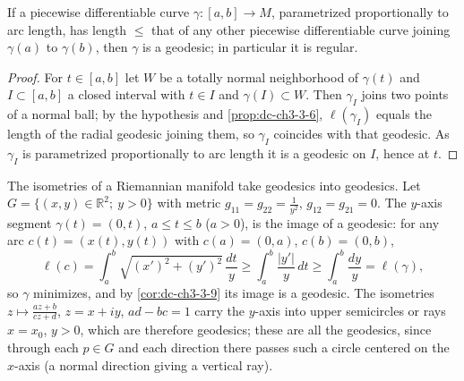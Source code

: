 \begin{corollary}
  \label{cor:dc-ch3-3-9}
  \leanok
  If a piecewise differentiable curve $\gamma:[a,b]\to M$, parametrized
  proportionally to arc length, has length $\le$ that of any other piecewise
  differentiable curve joining $\gamma(a)$ to $\gamma(b)$, then $\gamma$ is a
  geodesic; in particular it is regular.
\end{corollary}
\begin{proof}
  \sketch
  \leanok
  For $t\in[a,b]$ let $W$ be a totally normal neighborhood of $\gamma(t)$
  and $I\subset[a,b]$ a closed interval with $t\in I$ and $\gamma(I)\subset W$.
  Then $\gamma_I$ joins two points of a normal ball; by the hypothesis and
  \cref{prop:dc-ch3-3-6}, $\ell(\gamma_I)$ equals the length of the radial geodesic joining
  them, so $\gamma_I$ coincides with that geodesic. As $\gamma_I$ is parametrized
  proportionally to arc length it is a geodesic on $I$, hence at $t$.
\end{proof}

\begin{example}
  \label{ex:dc-ch3-3-10}
  \notready
  \notready
  The isometries of a Riemannian manifold take geodesics into geodesics.
  Let $G=\{(x,y)\in\mathbb{R}^2;\ y>0\}$ with metric $g_{11}=g_{22}=\frac{1}{y^2}$,
  $g_{12}=g_{21}=0$. The $y$-axis segment $\gamma(t)=(0,t)$, $a\le t\le b$ ($a>0$),
  is the image of a geodesic: for any arc $c(t)=(x(t),y(t))$ with $c(a)=(0,a)$,
  $c(b)=(0,b)$,
  $$
  \ell(c)=\int_a^b\sqrt{(x')^2+(y')^2}\,\frac{dt}{y}\ge\int_a^b\frac{|y'|}{y}\,dt\ge\int_a^b\frac{dy}{y}=\ell(\gamma),
  $$
  so $\gamma$ minimizes, and by \cref{cor:dc-ch3-3-9} its image is a geodesic. The
  isometries $z\mapsto\frac{az+b}{cz+d}$, $z=x+iy$, $ad-bc=1$ carry the $y$-axis
  into upper semicircles or rays $x=x_0$, $y>0$, which
  are therefore geodesics; these are all the geodesics, since through each $p\in G$
  and each direction there passes such a circle centered on the $x$-axis (a normal
  direction giving a vertical ray).
\end{example}

